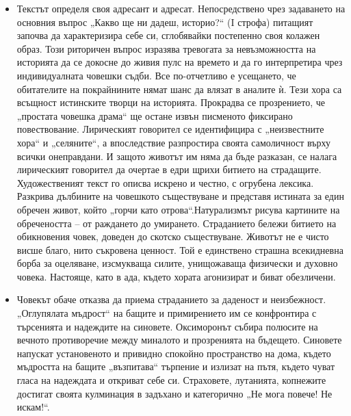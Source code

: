\documentclass[12pt,a4paper]{article}
\begin{document}
\begin{itemize}[leftmargin=*]
\vspace{-0.45cm}
\item Текстът определя своя адресант и адресат. Непосредствено чрез задаването на основния въпрос „Какво ще ни дадеш, историо?“ (I строфа) питащият започва да характеризира себе си, сглобявайки постепенно своя колажен образ. Този риторичен въпрос изразява тревогата за невъзможността на историята да се докосне до живия пулс на времето и да го интерпретира чрез индивидуалната човешки съдби. Все по-отчетливо е усещането, че обитателите на покрайнините нямат шанс да влязат в аналите ѝ. Тези хора са всъщност истинските творци на историята. Прокрадва се прозрението, че „простата човешка драма“ ще остане извън писменото фиксирано повествование. Лирическият говорител се идентифицира с „неизвестните хора“ и „селяните“, а впоследствие разпростира своята самоличност върху всички онеправдани. И защото животът им няма да бъде разказан, се налага лирическият говорител да очертае в едри щрихи битието на страдащите. Художественият текст го описва искрено и честно, с огрубена лексика. Разкрива дълбините на човешкото съществуване и представя истината за един обречен живот, който „горчи като отрова“.Натурализмът рисува картините на обречеността – от раждането до умирането. Страданието бележи битието на обикновения човек, доведен до скотско съществуване. Животът не е чисто висше благо, нито съкровена ценност. Той е единствено страшна всекидневна борба за оцеляване, изсмукваща силите, унищожаваща физически и духовно човека. Настояще, като в ада, където хората агонизират и биват обезличени.
\end{itemize}

\begin{itemize}[leftmargin=*]
\vspace{-0.45cm}
\item Човекът обаче отказва да приема страданието за даденост и неизбежност. „Оглупялата мъдрост“ на бащите и примирението им се конфронтира с търсенията и надеждите на синовете. Оксиморонът събира полюсите на вечното противоречие между миналото и прозренията на бъдещето. Синовете напускат установеното и привидно спокойно пространство на дома, където мъдростта на бащите „възпитава“ търпение и излизат на пътя, където чуват гласа на надеждата и откриват себе си. Страховете, лутанията, копнежите достигат своята кулминация в задъхано и категорично „Не мога повече! Не искам!“.
\end{itemize}
\end{document}

